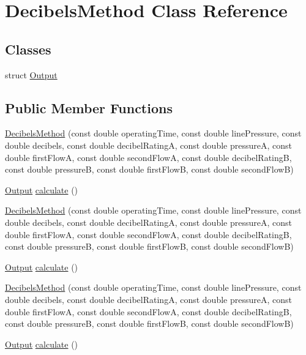 \hypertarget{class_decibels_method}{}\section{Decibels\+Method Class Reference}
\label{class_decibels_method}
\subsection*{Classes}
\begin{DoxyCompactItemize}
\item 
struct \hyperlink{struct_decibels_method_1_1_output}{Output}
\end{DoxyCompactItemize}
\subsection*{Public Member Functions}
\begin{DoxyCompactItemize}
\item 
\hyperlink{class_decibels_method_a6c07aed44c1a9a71a0b7118962aa5293}{Decibels\+Method} (const double operating\+Time, const double line\+Pressure, const double decibels, const double decibel\+RatingA, const double pressureA, const double first\+FlowA, const double second\+FlowA, const double decibel\+RatingB, const double pressureB, const double first\+FlowB, const double second\+FlowB)
\item 
\hyperlink{struct_decibels_method_1_1_output}{Output} \hyperlink{class_decibels_method_a11f20eb195bb2d791b34ba8771af0a67}{calculate} ()
\item 
\hyperlink{class_decibels_method_a6c07aed44c1a9a71a0b7118962aa5293}{Decibels\+Method} (const double operating\+Time, const double line\+Pressure, const double decibels, const double decibel\+RatingA, const double pressureA, const double first\+FlowA, const double second\+FlowA, const double decibel\+RatingB, const double pressureB, const double first\+FlowB, const double second\+FlowB)
\item 
\hyperlink{struct_decibels_method_1_1_output}{Output} \hyperlink{class_decibels_method_a89591fa032865b58a6d63c05bc16eb8b}{calculate} ()
\item 
\hyperlink{class_decibels_method_a6c07aed44c1a9a71a0b7118962aa5293}{Decibels\+Method} (const double operating\+Time, const double line\+Pressure, const double decibels, const double decibel\+RatingA, const double pressureA, const double first\+FlowA, const double second\+FlowA, const double decibel\+RatingB, const double pressureB, const double first\+FlowB, const double second\+FlowB)
\item 
\hyperlink{struct_decibels_method_1_1_output}{Output} \hyperlink{class_decibels_method_a89591fa032865b58a6d63c05bc16eb8b}{calculate} ()
\end{DoxyCompactItemize}


